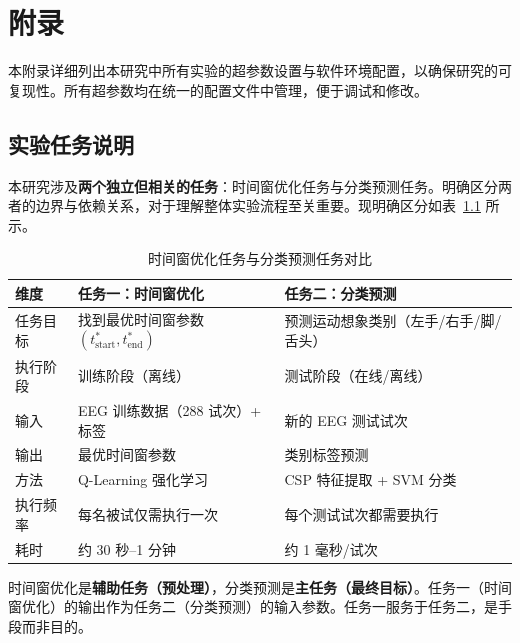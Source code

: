 
\chapter{附录}
\label{chap:appendix}

本附录详细列出本研究中所有实验的超参数设置与软件环境配置，以确保研究的可复现性。所有超参数均在统一的配置文件中管理，便于调试和修改。

\section{实验任务说明}
\label{sec:task_description}

本研究涉及\textbf{两个独立但相关的任务}：时间窗优化任务与分类预测任务。明确区分两者的边界与依赖关系，对于理解整体实验流程至关重要。现明确区分如表~\ref{tab:task_comparison} 所示。

\begin{table}[H]
\centering
\caption{时间窗优化任务与分类预测任务对比}
\label{tab:task_comparison}
\begin{tabular}{lll}
\hline
\textbf{维度} & \textbf{任务一：时间窗优化} & \textbf{任务二：分类预测} \\
\hline
任务目标 & 找到最优时间窗参数 $(t_{\text{start}}^*, t_{\text{end}}^*)$ & 预测运动想象类别（左手/右手/脚/舌头） \\
执行阶段 & 训练阶段（离线） & 测试阶段（在线/离线） \\
输入 & EEG 训练数据（288 试次）+ 标签 & 新的 EEG 测试试次 \\
输出 & 最优时间窗参数 & 类别标签预测 \\
方法 & Q-Learning 强化学习 & CSP 特征提取 + SVM 分类 \\
执行频率 & 每名被试仅需执行一次 & 每个测试试次都需要执行 \\
耗时 & 约 30 秒--1 分钟 & 约 1 毫秒/试次 \\
\hline
\end{tabular}
\end{table}

时间窗优化是\textbf{辅助任务（预处理）}，分类预测是\textbf{主任务（最终目标）}。任务一（时间窗优化）的输出作为任务二（分类预测）的输入参数。任务一服务于任务二，是手段而非目的。

\label{subsec:clarification}

